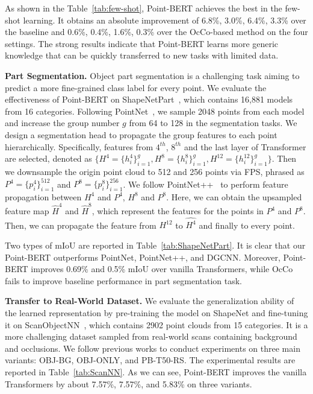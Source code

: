 \documentclass[10pt,twocolumn,letterpaper]{article}
\newcommand{\paragrapha}[2][5pt]{\vspace{#1}\noindent\textbf{#2}}
\begin{document}
As shown in the Table~\ref{tab:few-shot}, Point-BERT achieves the best in the few-shot learning. It obtains an absolute improvement of 6.8\%, 3.0\%, 6.4\%, 3.3\% over the baseline and 0.6\%, 0.4\%, 1.6\%, 0.3\% over the OcCo-based method on the four settings. The strong results indicate that Point-BERT learns more generic knowledge that can be quickly transferred to new tasks with limited data.



\paragrapha{Part Segmentation.}
Object part segmentation is a challenging task aiming to predict a more fine-grained class label for every point.
We evaluate the effectiveness of Point-BERT on  ShapeNetPart~\cite{yi2016scalable}, which contains 16,881 models from 16 categories. Following PointNet~\cite{pointnet}, we sample 2048 points from each model and increase the group number $g$ from 64 to 128 in the segmentation tasks. We design a segmentation head to propagate the group features to each point hierarchically.
Specifically, features from $4^{th}$, $8^{th}$ and the last layer of Transformer are selected, denoted as $\{ H^4 = \{h_i^4\}_{i=1}^g , H^8 = \{h_i^8\}_{i=1}^g , H^{12} = \{h_i^{12}\}_{i=1}^g \}$.
 Then we downsample the origin point cloud to 512 and 256 points via FPS, phrased as $P^4 = \{p^4_i\}_{i=1}^{512}$ and $ P^8= \{p^8_i\}_{i=1}^{256}$. We follow PointNet++~\cite{pointnet2} to perform feature propagation between $H^4$ and $P^4$, $H^8$ and $P^8$. Here, we can obtain the upsampled feature map $\hat{H}^4$ and $\hat{H}^8$, which represent the features for the points in $P^4$ and $P^8$. Then, we can propagate the feature from $H^{12}$ to $\hat{H^4}$ and finally to every  point. 

Two types of mIoU are reported in Table~\ref{tab:ShapeNetPart}. It is clear that our Point-BERT outperforms PointNet, PointNet++, and DGCNN. Moreover, Point-BERT improves 0.69\% and 0.5\% mIoU over vanilla Transformers, while OcCo fails to improve baseline performance in part segmentation task.

\paragrapha{Transfer to Real-World Dataset.} We evaluate the generalization ability of the learned representation by pre-training the model on ShapeNet and fine-tuning it on ScanObjectNN~\cite{uy2019revisiting}, which contains 2902 point clouds from 15 categories. It is a more challenging dataset sampled from real-world scans containing background and occlusions. We follow previous works to conduct experiments on three main variants: OBJ-BG, OBJ-ONLY, and PB-T50-RS. The experimental results are reported in Table~\ref{tab:ScanNN}. 
As we can see, Point-BERT improves the vanilla Transformers by about 7.57\%, 7.57\%, and 5.83\% on three variants. 
\end{document}
